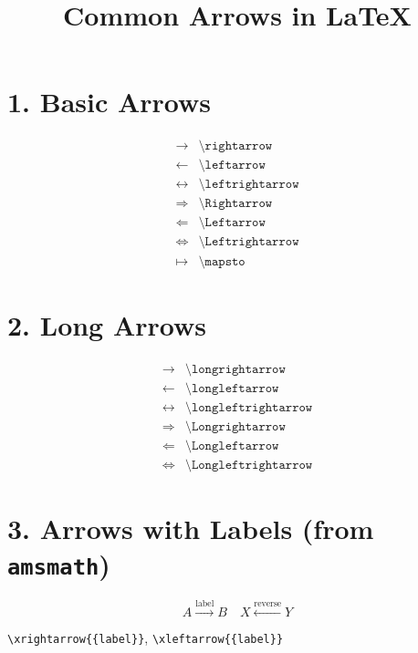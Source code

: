 \documentclass{article}
\title{Common Arrows in LaTeX}
\author{}
\date{}
\begin{document}
\maketitle

\section*{1. Basic Arrows}

\[
\begin{array}{ll}
\rightarrow & \texttt{\textbackslash{}rightarrow} \\
\leftarrow & \texttt{\textbackslash{}leftarrow} \\
\leftrightarrow & \texttt{\textbackslash{}leftrightarrow} \\
\Rightarrow & \texttt{\textbackslash{}Rightarrow} \\
\Leftarrow & \texttt{\textbackslash{}Leftarrow} \\
\Leftrightarrow & \texttt{\textbackslash{}Leftrightarrow} \\
\mapsto & \texttt{\textbackslash{}mapsto}
\end{array}
\]

\section*{2. Long Arrows}

\[
\begin{array}{ll}
\longrightarrow & \texttt{\textbackslash{}longrightarrow} \\
\longleftarrow & \texttt{\textbackslash{}longleftarrow} \\
\longleftrightarrow & \texttt{\textbackslash{}longleftrightarrow} \\
\Longrightarrow & \texttt{\textbackslash{}Longrightarrow} \\
\Longleftarrow & \texttt{\textbackslash{}Longleftarrow} \\
\Longleftrightarrow & \texttt{\textbackslash{}Longleftrightarrow}
\end{array}
\]

\section*{3. Arrows with Labels (from \texttt{amsmath})}

\[
A \xrightarrow{\text{label}} B \quad
X \xleftarrow{\text{reverse}} Y
\]

\texttt{\textbackslash{}xrightarrow\{\text\{label\}\}}, 
\texttt{\textbackslash{}xleftarrow\{\text\{label\}\}}
\end{document}
